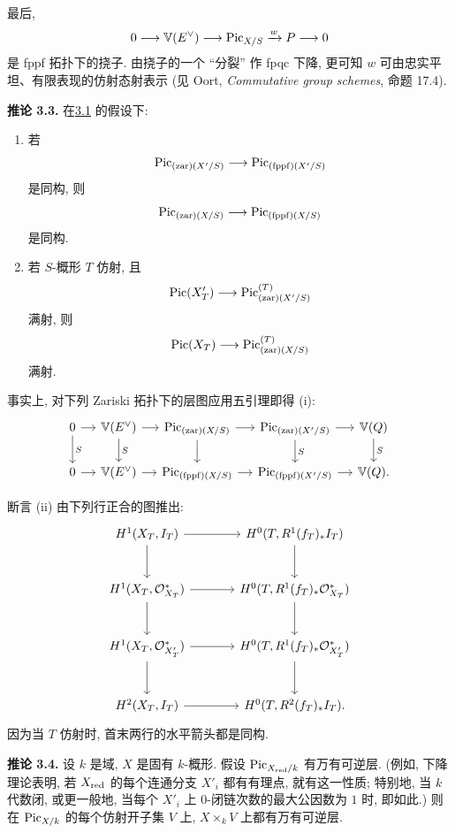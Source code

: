 最后,
\[
  0\longrightarrow\mathbb V(E^\vee)\longrightarrow\operatorname{Pic}_{X/S}
  \xrightarrow{w}P\longrightarrow0
\]
是 fppf 拓扑下的挠子. 由挠子的一个 ``分裂'' 作 fpqc 下降, 更可知 $w$ 可由忠实平坦、有限表现的仿射态射表示 (见 Oort, \emph{Commutative group schemes}, 命题 17.4).

\textbf{推论 3.3.} 在\hyperlink{sga6.e12.prop.3-1}{3.1} 的假设下:
\begin{enumerate}[label=\roman*)]
\item 若
  \[
    \operatorname{Pic}_{(\mathrm{zar})(X'/S)}\longrightarrow
    \operatorname{Pic}_{(\mathrm{fppf})(X'/S)}
  \]
  是同构, 则
  \[
    \operatorname{Pic}_{(\mathrm{zar})(X/S)}\longrightarrow
    \operatorname{Pic}_{(\mathrm{fppf})(X/S)}
  \]
  是同构.
\item 若 $S$-概形 $T$ 仿射, 且
  \[
    \operatorname{Pic}(X'_T)\longrightarrow\operatorname{Pic}_{(\mathrm{zar})(X'/S)}^{(T)}
  \]
  满射, 则
  \[
    \operatorname{Pic}(X_T)\longrightarrow\operatorname{Pic}_{(\mathrm{zar})(X/S)}^{(T)}
  \]
  满射.
\end{enumerate}

事实上, 对下列 Zariski 拓扑下的层图应用五引理即得 (i):
\[
\begin{tikzcd}[column sep=small]
0 \arrow[r] \arrow[d,"S"] &
  \mathbb V(E^\vee) \arrow[r] \arrow[d,"S"] &
  \Pic_{(\mathrm{zar})(X/S)} \arrow[r] \arrow[d] &
  \Pic_{(\mathrm{zar})(X'/S)} \arrow[r] \arrow[d,"S"] &
  \mathbb V(Q) \arrow[d,"S"]\\
0 \arrow[r] & \mathbb V(E^\vee) \arrow[r] &
  \Pic_{(\mathrm{fppf})(X/S)} \arrow[r] &
  \Pic_{(\mathrm{fppf})(X'/S)} \arrow[r] & \mathbb V(Q).
\end{tikzcd}
\]

断言 (ii) 由下列行正合的图推出:
\[
\begin{tikzcd}[column sep=large,row sep=large]
H^1(X_T,I_T) \arrow[r] \arrow[d] & H^0(T,R^1(f_T)_*I_T) \arrow[d]\\
H^1(X_T,\mathcal O_{X_T}^{*}) \arrow[r] \arrow[d] &
  H^0(T,R^1(f_T)_*\mathcal O_{X_T}^{*}) \arrow[d]\\
H^1(X_T,\mathcal O_{X'_T}^{*}) \arrow[r] \arrow[d] &
  H^0(T,R^1(f_T)_*\mathcal O_{X'_T}^{*}) \arrow[d]\\
H^2(X_T,I_T) \arrow[r] & H^0(T,R^2(f_T)_*I_T).
\end{tikzcd}
\]
因为当 $T$ 仿射时, 首末两行的水平箭头都是同构.

\textbf{推论 3.4.} 设 $k$ 是域, $X$ 是固有 $k$-概形. 假设 $\operatorname{Pic}_{X_{\mathrm{red}}/k}$ 有万有可逆层. (例如, 下降理论表明, 若 $X_{\mathrm{red}}$ 的每个连通分支 $X'_i$ 都有有理点, 就有这一性质; 特别地, 当 $k$ 代数闭, 或更一般地, 当每个 $X'_i$ 上 $0$-闭链次数的最大公因数为 $1$ 时, 即如此.) 则在 $\operatorname{Pic}_{X/k}$ 的每个仿射开子集 $V$ 上, $X\times_kV$ 上都有万有可逆层.

